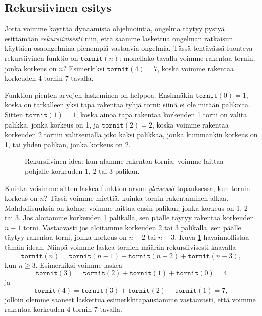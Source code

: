 \subsection{Rekursiivinen esitys}

Jotta voimme käyttää dynaamista ohjelmointia,
ongelma täytyy pystyä esit\-tämään \emph{rekursiivisesti}
niin, että saamme laskettua ongelman ratkaisun
käyt\-täen osaongelmina pienempiä vastaavia ongelmia.
Tässä tehtävässä luonteva rekursiivinen funktio on
$\texttt{tornit}(n)$: monellako tavalla voimme
rakentaa tornin, jonka korkeus on $n$?
Esimerkiksi $\texttt{tornit}(4)=7$, koska
voimme rakentaa korkeuden 4 tornin 7 tavalla.

Funktion pienten arvojen laskeminen on helppoa.
Ensinnäkin $\texttt{tornit}(0)=1$, koska on
tarkalleen yksi tapa rakentaa tyhjä torni:
siinä ei ole mitään palikoita.
Sitten $\texttt{tornit}(1)=1$, koska ainoa tapa
rakentaa korkeuden 1 torni on valita palikka, jonka korkeus on 1,
ja $\texttt{tornit}(2)=2$, koska voimme
rakentaa korkeuden 2 tornin valitsemalla joko
kaksi palikkaa, jonka kummankin korkeus on 1,
tai yhden palikan, jonka korkeus on 2.

\begin{figure}
\center
{}
\caption{Rekursiivinen idea: kun alamme rakentaa tornia, voimme laittaa pohjalle
korkeuden 1, 2 tai 3 palikan.}
\label{fig:dynrek}
\end{figure}

Kuinka voisimme sitten laskea funktion arvon \emph{yleisessä} tapauksessa,
kun tornin korkeus on $n$?
Tässä voimme miettiä, kuinka tornin rakentaminen alkaa.
Mahdollisuuksia on kolme: voimme laittaa ensin palikan,
jonka korkeus on 1, 2 tai 3.
Jos aloitamme korkeuden 1 palikalla, sen päälle
täytyy rakentaa korkeuden $n-1$ torni.
Vastaavasti jos aloitamme korkeuden 2 tai 3 palikalla,
sen päälle täytyy rakentaa torni,
jonka korkeus on $n-2$ tai $n-3$.
Kuva \ref{fig:dynrek} havainnollistaa tämän idean.
Niinpä voimme laskea tornien määrän rekursiivisesti kaavalla
\[
\texttt{tornit}(n) = \texttt{tornit}(n-1)+\texttt{tornit}(n-2)+\texttt{tornit}(n-3),
\]
kun $n \ge 3$.
Esimerkiksi voimme laskea
\[
\texttt{tornit}(3) = \texttt{tornit}(2)+\texttt{tornit}(1)+\texttt{tornit}(0)=4
\]
ja
\[
\texttt{tornit}(4) = \texttt{tornit}(3)+\texttt{tornit}(2)+\texttt{tornit}(1)=7,
\]
jolloin olemme saaneet laskettua esimerkkitapaustamme vastaavasti,
että voimme rakentaa korkeuden 4 tornin 7 tavalla.

